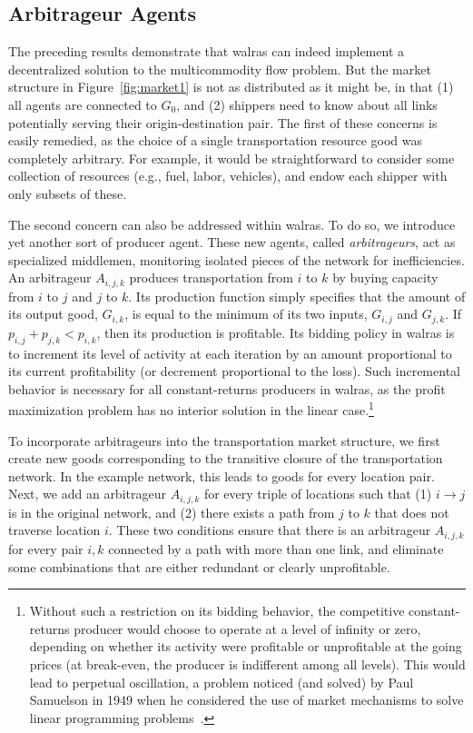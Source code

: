 \subsection{Arbitrageur Agents}

The preceding results demonstrate that {\sc walras} can indeed
implement a decentralized solution to the multicommodity flow problem.
But the market structure in Figure~\ref{fig:market1} is not as
distributed as it might be, in that (1) all agents are connected to
$G_0$, and (2) shippers need to know about all links potentially serving their
origin-destination pair.  The first of these concerns is easily
remedied, as the choice of a single transportation resource good was
completely arbitrary.  For example, it would be straightforward to
consider some collection of resources (e.g., fuel, labor, vehicles),
and endow each shipper with only subsets of these.

The second concern can also be addressed within {\sc walras}.  To do
so, we introduce yet another sort of producer agent.  These new
agents, called {\em arbitrageurs}, act as specialized middlemen,
monitoring isolated pieces of the network for inefficiencies.  An
arbitrageur $A_{i,j,k}$ produces transportation from $i$ to $k$ by buying 
capacity from $i$ to $j$ and $j$ to $k$.
Its production function simply
specifies that the amount of its output good, $G_{i,k}$, is equal to the
minimum of its two inputs, $G_{i,j}$ and $G_{j,k}$.
If $p_{i,j}+p_{j,k}<p_{i,k}$, then its production is
profitable.  Its bidding policy in {\sc walras} is to increment its
level of activity at each iteration by an amount proportional to its
current profitability (or decrement proportional to the loss).  Such
incremental behavior is necessary for all
constant-returns producers in {\sc walras}, as the profit maximization
problem has no interior solution in the linear case.\footnote{Without such a 
restriction on its bidding behavior, the competitive constant-returns 
producer would choose to operate at a level of infinity or zero, 
depending on whether its activity were profitable or unprofitable at the 
going prices (at break-even, the producer is indifferent among all 
levels).  This would lead to perpetual oscillation, a problem noticed 
(and solved)
by Paul Samuelson in 1949 when he considered the use of market mechanisms 
to solve linear programming problems~\cite{Samuelson66}.}

To incorporate arbitrageurs into the transportation market structure,
we first create new goods corresponding to the transitive closure of
the transportation network.  In the example network, this leads to
goods for every location pair.  Next, we add an arbitrageur
$A_{i,j,k}$ for every triple of locations such that (1) $i\rightarrow
j$ is in the original network, and (2) there exists a path from $j$ to
$k$ that does not traverse location $i$.  These two conditions ensure 
that there is an arbitrageur $A_{i,j,k}$ for every pair $i,k$ connected 
by a path with more than one link, and eliminate some combinations that 
are either redundant or clearly unprofitable.

